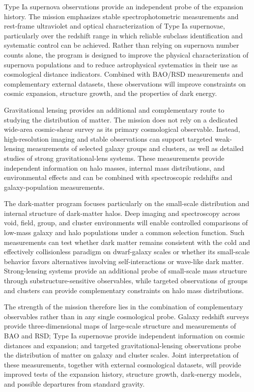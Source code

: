 Type Ia supernova observations provide an independent probe of the expansion history. The mission emphasizes stable spectrophotometric measurements and rest-frame ultraviolet and optical characterization of Type Ia supernovae, particularly over the redshift range in which reliable subclass identification and systematic control can be achieved. Rather than relying on supernova number counts alone, the program is designed to improve the physical characterization of supernova populations and to reduce astrophysical systematics in their use as cosmological distance indicators. Combined with BAO/RSD measurements and complementary external datasets, these observations will improve constraints on cosmic expansion, structure growth, and the properties of dark energy.

Gravitational lensing provides an additional and complementary route to studying the distribution of matter. The mission does not rely on a dedicated wide-area cosmic-shear survey as its primary cosmological observable. Instead, high-resolution imaging and stable observations can support targeted weak-lensing measurements of selected galaxy groups and clusters, as well as detailed studies of strong gravitational-lens systems. These measurements provide independent information on halo masses, internal mass distributions, and environmental effects and can be combined with spectroscopic redshifts and galaxy-population measurements.

The dark-matter program focuses particularly on the small-scale distribution and internal structure of dark-matter halos. Deep imaging and spectroscopy across void, field, group, and cluster environments will enable controlled comparisons of low-mass galaxy and halo populations under a common selection function. Such measurements can test whether dark matter remains consistent with the cold and effectively collisionless paradigm on dwarf-galaxy scales or whether its small-scale behavior favors alternatives involving self-interactions or wave-like dark matter. Strong-lensing systems provide an additional probe of small-scale mass structure through substructure-sensitive observables, while targeted observations of groups and clusters can provide complementary constraints on halo mass distributions.

The strength of the mission therefore lies in the combination of complementary observables rather than in any single cosmological probe. Galaxy redshift surveys provide three-dimensional maps of large-scale structure and measurements of BAO and RSD; Type Ia supernovae provide independent information on cosmic distances and expansion; and targeted gravitational-lensing observations probe the distribution of matter on galaxy and cluster scales. Joint interpretation of these measurements, together with external cosmological datasets, will provide improved tests of the expansion history, structure growth, dark-energy models, and possible departures from standard gravity.

